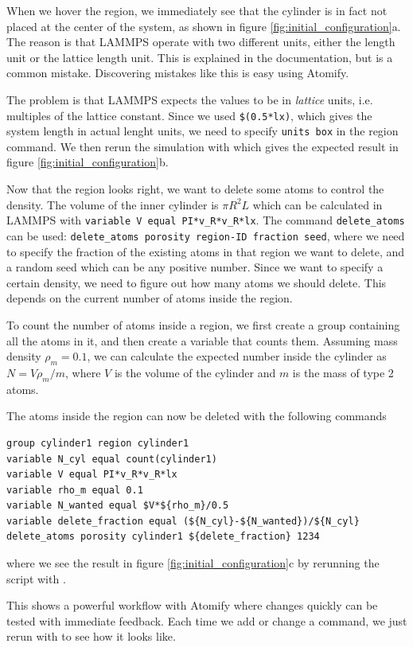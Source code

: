 \documentclass[12pt,a4paper,final]{iopart}
\newcommand{\code}[1]{\colorbox{light-gray}{\color{RawSienna}\texttt{#1}}}
\begin{document}
When we hover the region, we immediately see that the cylinder is in fact not placed at the center of the system, as shown in figure \ref{fig:initial_configuration}a.
The reason is that LAMMPS operate with two different units, either the length unit or the lattice length unit. This is explained in the documentation, but is a common mistake.
Discovering mistakes like this is easy using Atomify.

The problem is that LAMMPS expects the values to be in \textit{lattice} units, i.e. multiples of the lattice constant.
Since we used \code{\$(0.5*lx)}, which gives the system length in actual lenght units, we need to specify \code{units box} in the region command.
We then rerun the simulation with  which gives the expected result in figure \ref{fig:initial_configuration}b.

Now that the region looks right, we want to delete some atoms to control the density.
The volume of the inner cylinder is $\pi R^2 L$ which can be calculated in LAMMPS with \code{variable V equal PI*v\_R*v\_R*lx}.
The command \code{delete\_atoms} can be used: \code{delete\_atoms porosity region-ID fraction seed},
where we need to specify the fraction of the existing atoms in that region we want to delete, and a random seed which can be any positive number.
Since we want to specify a certain density, we need to figure out how many atoms we
should delete. This depends on the current number of atoms inside the region.

To count the number of atoms inside a region, we first create a group containing all the atoms in it, and then create a variable that counts them.
Assuming mass density $\rho_m = 0.1$, we can calculate the expected number inside the cylinder as $N = V\rho_m/m$,
where $V$ is the volume of the cylinder and $m$ is the mass of type 2 atoms.

The atoms inside the region can now be deleted with the following commands
\begin{lstlisting}
group cylinder1 region cylinder1
variable N_cyl equal count(cylinder1)
variable V equal PI*v_R*v_R*lx
variable rho_m equal 0.1
variable N_wanted equal $V*${rho_m}/0.5
variable delete_fraction equal (${N_cyl}-${N_wanted})/${N_cyl}
delete_atoms porosity cylinder1 ${delete_fraction} 1234
\end{lstlisting}
where we see the result in figure \ref{fig:initial_configuration}c by rerunning the script with .

This shows a powerful workflow with Atomify where changes quickly can be tested with immediate feedback.
Each time we add or change a command, we just rerun with  to see how it looks like.
\end{document}
